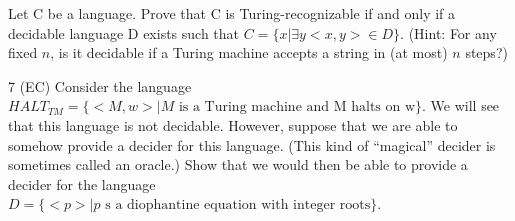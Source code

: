 \begin{problem}{6}
  Let C be a language. Prove that C is Turing-recognizable if and only if a decidable language D exists such that $C =
  \{x | \exists y <x,y> \in D\}$. (Hint: For any fixed $n$, is it decidable if a Turing machine accepts a string in (at
  most) $n$ steps?)
\end{problem}

\begin{problem}{7 (EC)}
  Consider the language $HALT_{TM} = \{<M,w> | M \text{ is a Turing machine and M halts on w} \}$. We will see that this
  language is not decidable. However, suppose that we are able to somehow provide a decider for this language. (This
  kind of ``magical'' decider is sometimes called an oracle.) Show that we would then be able to provide a decider for
  the language $D = \{<p> | p \text{ s a diophantine equation with integer roots}\}$.
\end{problem}


